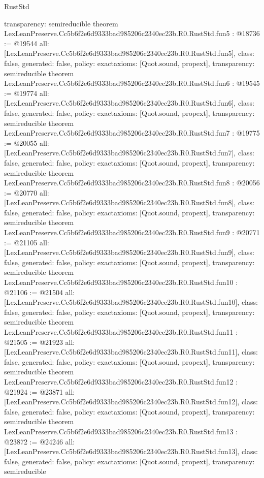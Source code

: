 \begin{lexlean}{RustStd}
\begin{coremodule}
{  transparency: semireducible
}
theorem LexLeanPreserve.Cc5b6f2e6d9333bad985206c2340ec23b.R0.RustStd.fun5 : @18736 := @19544 {
  all: [LexLeanPreserve.Cc5b6f2e6d9333bad985206c2340ec23b.R0.RustStd.fun5],
  class: false,
  generated: false,
  policy: exact{axioms: [Quot.sound, propext]},
  transparency: semireducible
}
theorem LexLeanPreserve.Cc5b6f2e6d9333bad985206c2340ec23b.R0.RustStd.fun6 : @19545 := @19774 {
  all: [LexLeanPreserve.Cc5b6f2e6d9333bad985206c2340ec23b.R0.RustStd.fun6],
  class: false,
  generated: false,
  policy: exact{axioms: [Quot.sound, propext]},
  transparency: semireducible
}
theorem LexLeanPreserve.Cc5b6f2e6d9333bad985206c2340ec23b.R0.RustStd.fun7 : @19775 := @20055 {
  all: [LexLeanPreserve.Cc5b6f2e6d9333bad985206c2340ec23b.R0.RustStd.fun7],
  class: false,
  generated: false,
  policy: exact{axioms: [Quot.sound, propext]},
  transparency: semireducible
}
theorem LexLeanPreserve.Cc5b6f2e6d9333bad985206c2340ec23b.R0.RustStd.fun8 : @20056 := @20770 {
  all: [LexLeanPreserve.Cc5b6f2e6d9333bad985206c2340ec23b.R0.RustStd.fun8],
  class: false,
  generated: false,
  policy: exact{axioms: [Quot.sound, propext]},
  transparency: semireducible
}
theorem LexLeanPreserve.Cc5b6f2e6d9333bad985206c2340ec23b.R0.RustStd.fun9 : @20771 := @21105 {
  all: [LexLeanPreserve.Cc5b6f2e6d9333bad985206c2340ec23b.R0.RustStd.fun9],
  class: false,
  generated: false,
  policy: exact{axioms: [Quot.sound, propext]},
  transparency: semireducible
}
theorem LexLeanPreserve.Cc5b6f2e6d9333bad985206c2340ec23b.R0.RustStd.fun10 : @21106 := @21504 {
  all: [LexLeanPreserve.Cc5b6f2e6d9333bad985206c2340ec23b.R0.RustStd.fun10],
  class: false,
  generated: false,
  policy: exact{axioms: [Quot.sound, propext]},
  transparency: semireducible
}
theorem LexLeanPreserve.Cc5b6f2e6d9333bad985206c2340ec23b.R0.RustStd.fun11 : @21505 := @21923 {
  all: [LexLeanPreserve.Cc5b6f2e6d9333bad985206c2340ec23b.R0.RustStd.fun11],
  class: false,
  generated: false,
  policy: exact{axioms: [Quot.sound, propext]},
  transparency: semireducible
}
theorem LexLeanPreserve.Cc5b6f2e6d9333bad985206c2340ec23b.R0.RustStd.fun12 : @21924 := @23871 {
  all: [LexLeanPreserve.Cc5b6f2e6d9333bad985206c2340ec23b.R0.RustStd.fun12],
  class: false,
  generated: false,
  policy: exact{axioms: [Quot.sound, propext]},
  transparency: semireducible
}
theorem LexLeanPreserve.Cc5b6f2e6d9333bad985206c2340ec23b.R0.RustStd.fun13 : @23872 := @24246 {
  all: [LexLeanPreserve.Cc5b6f2e6d9333bad985206c2340ec23b.R0.RustStd.fun13],
  class: false,
  generated: false,
  policy: exact{axioms: [Quot.sound, propext]},
  transparency: semireducible
}
\end{coremodule}
\end{lexlean}
